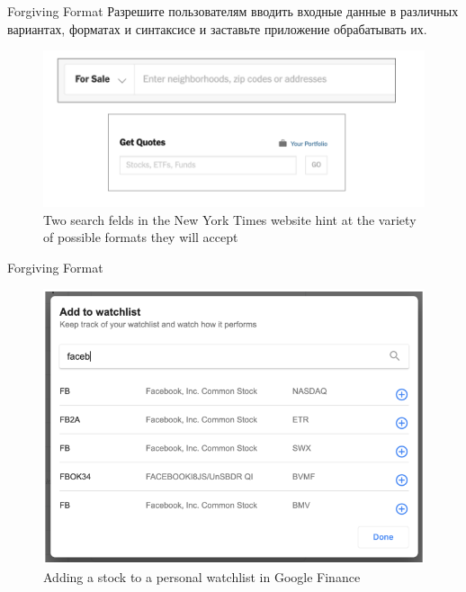 \documentclass{beamer}
\begin{document}
\begin{frame}[t]{Forgiving Format}
	Разрешите пользователям вводить входные данные в различных вариантах, форматах и синтаксисе и заставьте
приложение обрабатывать их.
	
	\begin{figure}[h]
		\centering
		\includegraphics[scale=0.6]{images/lec08-pic31.png}
		\caption{Two search felds in the New York Times website hint at the variety of possible formats they will accept}
	\end{figure}	
\end{frame}

\begin{frame}[t]{Forgiving Format}
	\begin{figure}[h]
		\centering
		\includegraphics[scale=0.4]{images/lec08-pic32.png}
		\caption{Adding a stock to a personal watchlist in Google Finance}
	\end{figure}
\end{frame}
\end{document}
